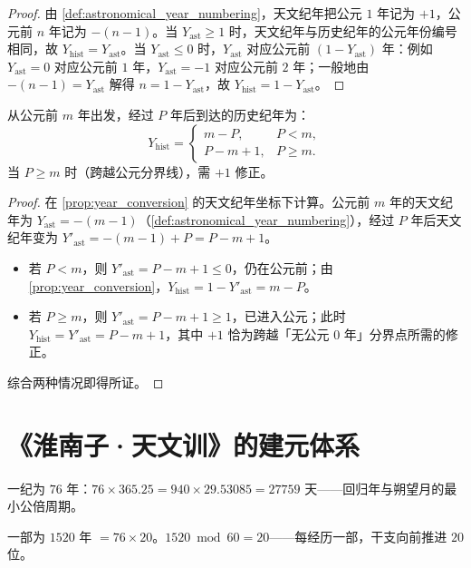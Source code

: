 \begin{proof}
由 \cref{def:astronomical_year_numbering}，天文纪年把公元 \(1\) 年记为 \(+1\)，公元前 \(n\) 年记为 \(-(n-1)\)。当 \(Y_{\text{ast}}\ge 1\) 时，天文纪年与历史纪年的公元年份编号相同，故 \(Y_{\text{hist}}=Y_{\text{ast}}\)。当 \(Y_{\text{ast}}\le 0\) 时，\(Y_{\text{ast}}\) 对应公元前 \((1-Y_{\text{ast}})\) 年：例如 \(Y_{\text{ast}}=0\) 对应公元前 \(1\) 年，\(Y_{\text{ast}}=-1\) 对应公元前 \(2\) 年；一般地由 \(-(n-1)=Y_{\text{ast}}\) 解得 \(n=1-Y_{\text{ast}}\)，故 \(Y_{\text{hist}}=1-Y_{\text{ast}}\)。
\end{proof}

\begin{theorem}[跨公元时间间隔的修正定理]\label{thm:cross_era_correction}
从公元前 \(m\) 年出发，经过 \(P\) 年后到达的历史纪年为：
\[
Y_{\text{hist}}=\begin{cases}
m-P, & P<m,\\
P-m+1, & P\ge m.
\end{cases}
\]
当 \(P\ge m\) 时（跨越公元分界线），需 \(+1\) 修正。
\end{theorem}

\begin{proof}
在 \cref{prop:year_conversion} 的天文纪年坐标下计算。公元前 \(m\) 年的天文纪年为 \(Y_{\text{ast}}=-(m-1)\)（\cref{def:astronomical_year_numbering}），经过 \(P\) 年后天文纪年变为 \(Y'_{\text{ast}}=-(m-1)+P=P-m+1\)。
\begin{itemize}
\item 若 \(P<m\)，则 \(Y'_{\text{ast}}=P-m+1\le 0\)，仍在公元前；由 \cref{prop:year_conversion}，\(Y_{\text{hist}}=1-Y'_{\text{ast}}=m-P\)。
\item 若 \(P\ge m\)，则 \(Y'_{\text{ast}}=P-m+1\ge 1\)，已进入公元；此时 \(Y_{\text{hist}}=Y'_{\text{ast}}=P-m+1\)，其中 \(+1\) 恰为跨越「无公元 \(0\) 年」分界点所需的修正。
\end{itemize}
综合两种情况即得所证。
\end{proof}

\section{《淮南子·天文训》的建元体系}
\label{sec:huainanzi}

\begin{definition}[一纪]\label{def:yiji}
一纪为 \(76\) 年：\(76\times 365.25=940\times 29.53085=27759\) 天——回归年与朔望月的最小公倍周期。
\end{definition}

\begin{definition}[一部——1520 年大终]\label{def:yibu}
一部为 \(1520\) 年 \(=76\times 20\)。\(1520\bmod 60=20\)——每经历一部，干支向前推进 \(20\) 位。
\end{definition}

